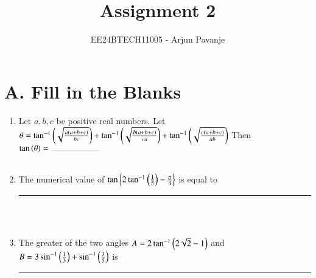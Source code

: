 \documentclass[journal,12pt,twocolumn,article]{IEEEtran}
\theoremstyle{remark}
\begin{document}

\vspace{3cm}

\title{Assignment 2}
\author{EE24BTECH11005 - Arjun Pavanje}
\maketitle
\newpage
\bigskip

\renewcommand{\thefigure}{\theenumi}
\renewcommand{\thetable}{\theenumi}
\section*{A. Fill in the Blanks}
\begin{enumerate}
\item Let $a,b,c$ be positive real numbers. Let
$\theta = \tan ^{-1}\left(\sqrt{\frac{a\left(a+b+c\right)}{bc}}\right) + \tan ^{-1}\left(\sqrt{\frac{b\left(a+b+c\right)}{ca}}\right) + \tan ^{-1}\left(\sqrt{\frac{c\left(a+b+c\right)}{ab}}\right) $
Then $\tan \brak{\theta}= \rule{2cm}{0.1pt}$ 
\hfill {}\\\\
\item The numerical value of $\tan \left\{ 2\tan ^{-1}\left(\frac{1}{5}\right)-\frac{\pi}{4}\right\}$ is equal to \rule{2cm}{0.1pt}
\hfill {}\\\\
\item The greater of the two angles $A = 2 \tan ^{-1}\left(2\sqrt{2}-1\right)$ and $B = 3\sin ^{-1}\left(\frac{1}{3}\right) + \sin ^{-1}\left(\frac{3}{5}\right)$ is \rule{2cm}{0.1pt}
\hfill {}\\\\
\end{enumerate}
\end{document}
